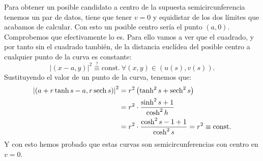 Para obtener un posible candidato a centro de la supuesta semicircunferencia
tenemos un par de datos, tiene que tener $v = 0$ y equidistar de los dos límites
que acabamos de calcular. Con esto un posible centro sería el punto $\left( a, 0
\right)$. Comprobemos que efectivamente lo es. Para ello vamos a ver que el
cuadrado, y por tanto sin el cuadrado también, de la distancia euclídea del
posible centro a cualquier punto de la curva es constante:
\[
\left\lvert \left( x - a , y \right) \right\rvert^2 \stackrel{?}{\equiv}
\mathrm{const.}\ \forall \left( x, y \right) \in \left( u\left( s \right), v\left( s
\right) \right).
\]
Sustituyendo el valor de un punto de la curva, tenemos que:
\begin{align*}
    \left\lvert \left( a + r \tanh s - a, r \operatorname{sech} s \right) \right\rvert^2 &=
    r^2 \left( \tanh^2 s + \operatorname{sech}^2 s \right)\\ 
    &= r^2 \cdot \frac{\sinh^2 s + 1}{\cosh^2 h}\\
    &= r^2 \cdot \frac{\cosh^2 s - 1 + 1}{\cosh^2 s} = r^2 \equiv \mathrm{const.}
\end{align*}
Y con esto hemos probado que estas curvas son semicircunferencias con centro
en $v = 0$.

